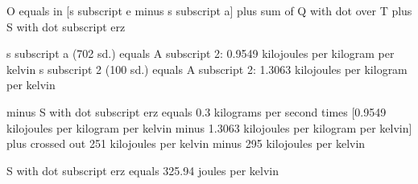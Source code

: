 O equals in [s subscript e minus s subscript a] plus sum of Q with dot over T plus S with dot subscript erz

s subscript a (702 sd.) equals A subscript 2: 0.9549 kilojoules per kilogram per kelvin  
s subscript 2 (100 sd.) equals A subscript 2: 1.3063 kilojoules per kilogram per kelvin  

minus S with dot subscript erz equals 0.3 kilograms per second times [0.9549 kilojoules per kilogram per kelvin minus 1.3063 kilojoules per kilogram per kelvin] plus crossed out 251 kilojoules per kelvin minus 295 kilojoules per kelvin  

S with dot subscript erz equals 325.94 joules per kelvin